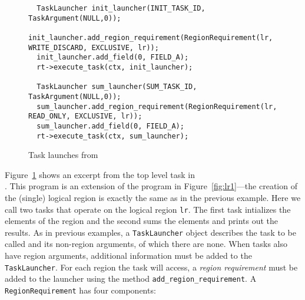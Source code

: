 \begin{figure}
{\small
\begin{lstlisting}
  TaskLauncher init_launcher(INIT_TASK_ID, TaskArgument(NULL,0));
  init_launcher.add_region_requirement(RegionRequirement(lr, WRITE_DISCARD, EXCLUSIVE, lr));
  init_launcher.add_field(0, FIELD_A);
  rt->execute_task(ctx, init_launcher);

  TaskLauncher sum_launcher(SUM_TASK_ID, TaskArgument(NULL,0));
  sum_launcher.add_region_requirement(RegionRequirement(lr, READ_ONLY, EXCLUSIVE, lr));
  sum_launcher.add_field(0, FIELD_A);
  rt->execute_task(ctx, sum_launcher);
\end{lstlisting}
}
\caption{Task launches from }
\label{fig:permissions}
\end{figure}


Figure~\ref{fig:permissions} shows an excerpt from the top level task in \\
.  This program is an extension of the
program in Figure~\ref{fig:lr1}---the creation of the (single) logical region is exactly the same as in the 
previous example.  Here we call two tasks that operate on the logical region {\tt lr}. The first
task intializes the elements of the region and the second sums the elements and prints out the results.
As in previous examples, a {\tt TaskLauncher} object describes the task to be called and its non-region arguments,
of which there are none.  When tasks also have region arguments, additional information must be added
to the {\tt TaskLauncher}.
For each region the task will access, a {\em region requirement} must be added to the launcher using the
method {\tt add\_region\_requirement}.  A {\tt RegionRequirement} has four components: 

